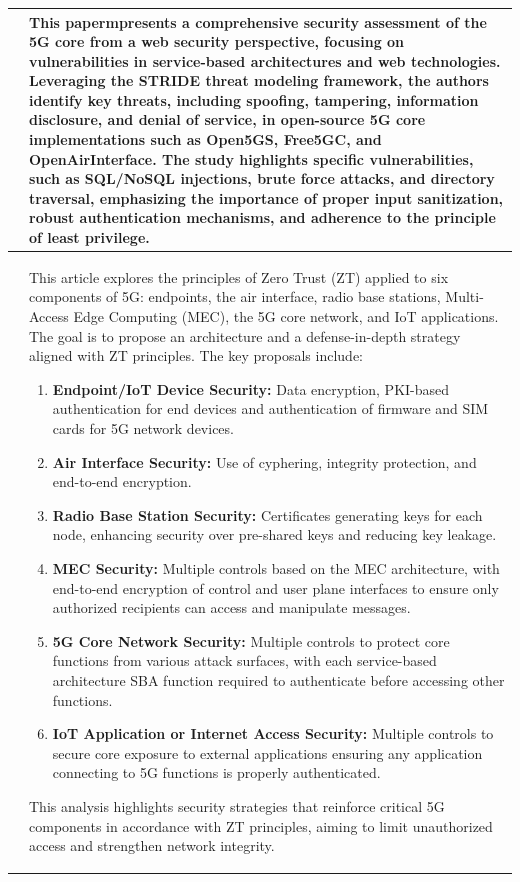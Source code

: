 \documentclass{report}
\begin{document}
\begin{longtable}{|p{4cm}|p{12cm}|}
    \cite{giambartolomei2024penetration} & This papermpresents a comprehensive security assessment of the 5G core from a web security perspective, focusing on vulnerabilities in service-based architectures and web technologies. Leveraging the STRIDE threat modeling framework, the authors identify key threats, including spoofing, tampering, information disclosure, and denial of service, in open-source 5G core implementations such as Open5GS, Free5GC, and OpenAirInterface.
    The study highlights specific vulnerabilities, such as SQL/NoSQL injections, brute force attacks, and directory traversal, emphasizing the importance of proper input sanitization, robust authentication mechanisms, and adherence to the principle of least privilege. \\
    \hline
    \cite{defenseindepth} & 
    \parbox[t]{12cm}{
    This article explores the principles of Zero Trust (ZT) applied to six components of 5G: endpoints, the air interface, radio base stations, Multi-Access Edge Computing (MEC), the 5G core network, and IoT applications. The goal is to propose an architecture and a defense-in-depth strategy aligned with ZT principles. The key proposals include:
    \begin{enumerate}
        \item \textbf{Endpoint/IoT Device Security:} Data encryption, PKI-based authentication for end devices and authentication of firmware and SIM cards for 5G network devices.
        \item \textbf{Air Interface Security:} Use of cyphering, integrity protection, and end-to-end encryption.  
        \item \textbf{Radio Base Station Security:} Certificates generating keys for each node, enhancing security over pre-shared keys and reducing key leakage.  
        \item \textbf{MEC Security:} Multiple controls based on the MEC architecture, with end-to-end encryption of control and user plane interfaces to ensure only authorized recipients can access and manipulate messages.  
        \item \textbf{5G Core Network Security:} Multiple controls to protect core functions from various attack surfaces, with each service-based architecture SBA function required to authenticate before accessing other functions.  
        \item \textbf{IoT Application or Internet Access Security:} Multiple controls to secure core exposure to external applications ensuring any application connecting to 5G functions is properly authenticated.  
    \end{enumerate}
    This analysis highlights security strategies that reinforce critical 5G components in accordance with ZT principles, aiming to limit unauthorized access and strengthen network integrity.
    } \\
    \hline


\end{longtable}
\end{document}
